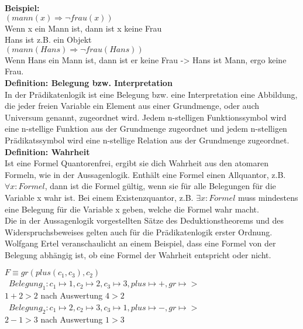 \textbf{Beispiel: }\\
$ (mann(x) \Rightarrow \neg frau(x))$\\
Wenn x ein Mann ist, dann ist x keine Frau\\

Hans ist z.B. ein Objekt\\
$ (mann(Hans) \Rightarrow \neg frau(Hans))$\\
Wenn Hans ein Mann ist, dann ist er keine Frau -> Hans ist Mann, ergo keine Frau.\\

\textbf{Definition: Belegung bzw. Interpretation}\\
In der Prädikatenlogik ist eine Belegung bzw. eine Interpretation eine Abbildung, die jeder freien Variable ein Element aus einer Grundmenge, oder auch Universum genannt, zugeordnet wird. Jedem n-stelligen Funktionssymbol wird eine n-stellige Funktion aus der Grundmenge zugeordnet und jedem n-stelligen Prädikatssymbol wird eine n-stellige Relation aus der Grundmenge zugeordnet.\cite[vgl. S.40 Def. 3.3]{GrundkursKI}\\

\textbf{Definition: Wahrheit}\\
Ist eine Formel Quantorenfrei, ergibt sie dich Wahrheit aus den atomaren Formeln, wie in der Aussagenlogik. Enthält eine Formel einen Allquantor, z.B. $ \forall x: Formel  $, dann ist die Formel gültig, wenn sie für alle Belegungen für die Variable x wahr ist. Bei einem Existenzquantor, z.B. $ \exists x: Formel$ muss mindestens eine Belegung für die Variable x geben, welche die Formel wahr macht.\cite[vgl. S.40 Def. 3.4]{GrundkursKI}\\
 
Die in der Aussagenlogik vorgestellten Sätze des Deduktionstheorems und des Widerspruchsbeweises gelten auch für die Prädikatenlogik erster Ordnung.\\

Wolfgang Ertel\cite{GrundkursKI} veranschaulicht an einem Beispiel, dass eine Formel von der Belegung abhängig ist, ob eine Formel der Wahrheit entspricht oder nicht. \\

\begin{center}
$
F\equiv gr(plus(c_1,c_3),c_2)
$\\
\,
$
Belegung_1 : c_1 \mapsto 1 , c_2 \mapsto 2 , c_3 \mapsto 3 , plus \mapsto + , gr \mapsto >  
$\\
$1+2 > 2$ nach Auswertung $4 > 2$\\
\,
$
Belegung_2 : c_1 \mapsto 2 , c_2 \mapsto 3 , c_3 \mapsto 1 , plus \mapsto - , gr \mapsto >  
$\\
$2-1 > 3$ nach Auswertung $1 > 3$
\end{center}
\cite[vgl. S.41]{GrundkursKI}\\

